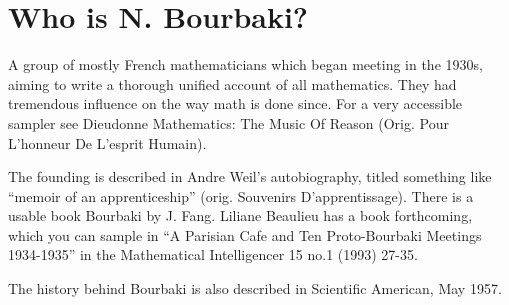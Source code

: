 \section{Who is N. Bourbaki?}

A group of mostly French mathematicians which began meeting in the
1930s, aiming to write a thorough unified account of all
mathematics. They had tremendous influence on the way math is done
since. For a very accessible sampler see Dieudonne Mathematics: The
Music Of Reason (Orig. Pour L'honneur De L'esprit Humain).

The founding is described in Andre Weil's autobiography, titled
something like ``memoir of an apprenticeship'' (orig. Souvenirs
D'apprentissage). There is a usable book Bourbaki by J. Fang. Liliane
Beaulieu has a book forthcoming, which you can sample in ``A Parisian
Cafe and Ten Proto-Bourbaki Meetings 1934-1935'' in the Mathematical
Intelligencer 15 no.1 (1993) 27-35.

The history behind Bourbaki is also described in Scientific American,
May 1957.
